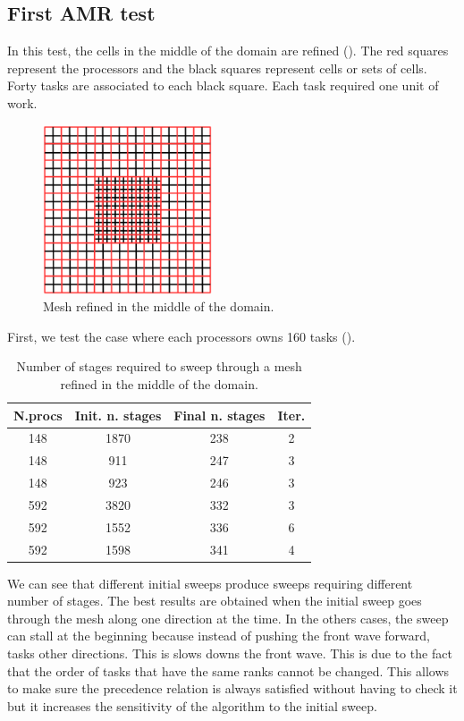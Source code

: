 \documentclass[letterpaper]{article}
\renewcommand{\(}{\left(}
\renewcommand{\)}{\right)}
\renewcommand{\[}{\left[}
\renewcommand{\]}{\right]}
\begin{document}
\subsection{First AMR test}
In this test, the cells in the middle of the domain are refined ().
The red squares represent the processors and the black squares represent cells
or sets of cells. Forty tasks are associated to each black square. Each task
required one unit of work.
\begin{figure}[H]
  \centering
  \includegraphics[width=5cm]{mesh}
  \caption{Mesh refined in the middle of the domain.}
  \label{mesh_1}
\end{figure}
First, we test the case where each processors owns 160 tasks ().
\begin{table}[H]
  \begin{center}
    \begin{tabular}{|c|c|c|c|}
      \hline
      N.procs & Init. n. stages & Final n. stages & Iter. \\
      \hline
      148 & 1870 & 238 & 2 \\
      148 &  911 & 247 & 3 \\
      148 &  923 & 246 & 3 \\
      592 & 3820 & 332 & 3 \\
      592 & 1552 & 336 & 6 \\
      592 & 1598 & 341 & 4 \\
      \hline
    \end{tabular}
    \caption{Number of stages required to sweep through a mesh refined
    in the middle of the domain.}
    \label{amr_1}
  \end{center}
\end{table}
We can see that different initial sweeps produce sweeps requiring different
number of stages. The best results are obtained when the initial sweep goes through the mesh
along one direction at the time. In the others cases, the sweep can stall at the beginning 
because instead of pushing the front wave forward, tasks other directions. This is slows 
downs the front wave. This is due to the fact that the order of tasks that have
the same ranks cannot be changed. This allows to make sure the precedence
relation is always satisfied without having to check it but it increases the
sensitivity of the algorithm to the initial sweep.
\end{document}
